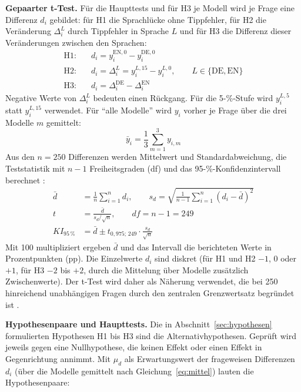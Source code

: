 \documentclass[a4paper,titlepage]{article}
\numberwithin{equation}{section} %
\begin{document}
\textbf{Gepaarter t-Test.} Für die Haupttests und für H3 je Modell wird je Frage eine Differenz $d_i$ gebildet: für H1 die Sprachlücke ohne Tippfehler, für H2 die Veränderung $\Delta_i^L$ durch Tippfehler in Sprache $L$ und für H3 die Differenz dieser Veränderungen zwischen den Sprachen:
\begin{align}
\text{H1:}\quad & d_i = y_i^{\mathrm{EN},0} - y_i^{\mathrm{DE},0} \label{eq:h1}\\
\text{H2:}\quad & d_i = \Delta_i^L = y_i^{L,15} - y_i^{L,0}, \qquad L \in \{\mathrm{DE}, \mathrm{EN}\} \label{eq:h2}\\
\text{H3:}\quad & d_i = \Delta_i^{\mathrm{DE}} - \Delta_i^{\mathrm{EN}} \label{eq:h3}
\end{align}
Negative Werte von $\Delta_i^L$ bedeuten einen Rückgang. Für die 5-\%-Stufe wird $y_i^{L,5}$ statt $y_i^{L,15}$ verwendet. Für "`alle Modelle"' wird $y_i$ vorher je Frage über die drei Modelle $m$ gemittelt:
\begin{equation}\label{eq:mittel}
\bar{y}_i = \frac{1}{3}\sum_{m=1}^{3} y_{i,m}
\end{equation}
Aus den $n = 250$ Differenzen werden Mittelwert und Standardabweichung, die Teststatistik mit $n-1$ Freiheitsgraden (df) und das 95-\%-Konfidenzintervall berechnet \citep[S.~119, 124--125]{bortz_statistik_2011}:
\begin{align}
\bar{d} &= \frac{1}{n}\sum_{i=1}^{n} d_i, \qquad s_d = \sqrt{\frac{1}{n-1}\sum_{i=1}^{n}\left(d_i - \bar{d}\right)^2} \label{eq:dbar}\\
t &= \frac{\bar{d}}{s_d/\sqrt{n}}, \qquad \mathit{df} = n - 1 = 249 \label{eq:t}\\
\mathit{KI}_{95\,\%} &= \bar{d} \pm t_{0{,}975;\,249} \cdot \frac{s_d}{\sqrt{n}} \label{eq:kit}
\end{align}
Mit 100 multipliziert ergeben $\bar{d}$ und das Intervall die berichteten Werte in Prozentpunkten (pp). Die Einzelwerte $d_i$ sind diskret (für H1 und H2 $-1$, 0 oder $+1$, für H3 $-2$ bis $+2$, durch die Mittelung über Modelle zusätzlich Zwischenwerte). Der t-Test wird daher als Näherung verwendet, die bei 250 hinreichend unabhängigen Fragen durch den zentralen Grenzwertsatz begründet ist \citep[S.~126]{bortz_statistik_2011}.

\textbf{Hypothesenpaare und Haupttests.} Die in Abschnitt~\ref{sec:hypothesen} formulierten Hypothesen H1 bis H3 sind die Alternativhypothesen. Geprüft wird jeweils gegen eine Nullhypothese, die keinen Effekt oder einen Effekt in Gegenrichtung annimmt. Mit $\mu_d$ als Erwartungswert der frageweisen Differenzen $d_i$ (über die Modelle gemittelt nach Gleichung~\eqref{eq:mittel}) lauten die Hypothesenpaare:
\end{document}
